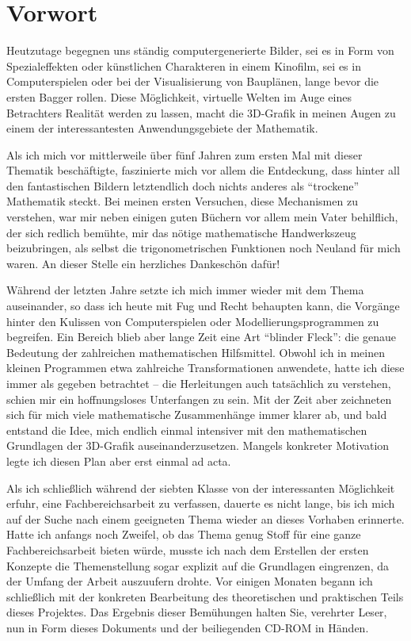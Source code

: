 \chapter*{Vorwort}

Heutzutage begegnen uns ständig computergenerierte Bilder, sei es in Form von Spezialeffekten oder künstlichen Charakteren in einem Kinofilm, sei es in Computerspielen oder bei der Visualisierung von Bauplänen, lange bevor die ersten Bagger rollen. Diese Möglichkeit, virtuelle Welten im Auge eines Betrachters Realität werden zu lassen, macht die 3D-Grafik in meinen Augen zu einem der interessantesten Anwendungsgebiete der Mathematik.

Als ich mich vor mittlerweile über fünf Jahren zum ersten Mal mit dieser Thematik beschäftigte, faszinierte mich vor allem die Entdeckung, dass hinter all den fantastischen Bildern letztendlich doch nichts anderes als \enquote{trockene} Mathematik steckt. Bei meinen ersten Versuchen, diese Mechanismen zu verstehen, war mir neben einigen guten Büchern vor allem mein Vater behilflich, der sich redlich bemühte, mir das nötige mathematische Handwerkszeug beizubringen, als selbst die trigonometrischen Funktionen noch Neuland für mich waren. An dieser Stelle ein herzliches Dankeschön dafür!

Während der letzten Jahre setzte ich mich immer wieder mit dem Thema auseinander, so dass ich heute mit Fug und Recht behaupten kann, die Vorgänge hinter den Kulissen von Computerspielen oder Modellierungsprogrammen zu begreifen. Ein Bereich blieb aber lange Zeit eine Art \enquote{blinder Fleck}: die genaue Bedeutung der zahlreichen mathematischen Hilfsmittel. Obwohl ich in meinen kleinen Programmen etwa zahlreiche Transformationen anwendete, hatte ich diese immer als gegeben betrachtet -- die Herleitungen auch tatsächlich zu verstehen, schien mir ein hoffnungsloses Unterfangen zu sein. Mit der Zeit aber zeichneten sich für mich viele mathematische Zusammenhänge immer klarer ab, und bald entstand die Idee, mich endlich einmal intensiver mit den mathematischen Grundlagen der 3D-Grafik auseinanderzusetzen. Mangels konkreter Motivation legte ich diesen Plan aber erst einmal ad acta.

Als ich schließlich während der siebten Klasse von der interessanten Möglichkeit erfuhr, eine Fachbereichsarbeit zu verfassen, dauerte es nicht lange, bis ich mich auf der Suche nach einem geeigneten Thema wieder an dieses Vorhaben erinnerte. Hatte ich anfangs noch Zweifel, ob das Thema genug Stoff für eine ganze Fachbereichsarbeit bieten würde, musste ich nach dem Erstellen der ersten Konzepte die Themenstellung sogar explizit auf die Grundlagen eingrenzen, da der Umfang der Arbeit auszuufern drohte. Vor einigen Monaten begann ich schließlich mit der konkreten Bearbeitung des theoretischen und praktischen Teils dieses Projektes. Das Ergebnis dieser Bemühungen halten Sie, verehrter Leser, nun in Form dieses Dokuments und der beiliegenden CD-ROM in Händen.

